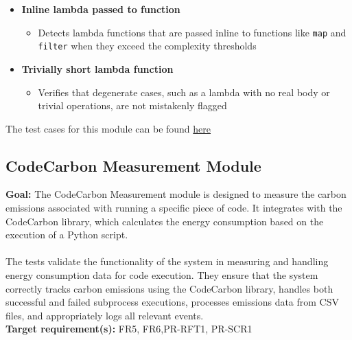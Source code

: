 \documentclass[12pt, titlepage]{article}
\begin{document}
\begin{itemize}
    \item \textbf{Inline lambda passed to function}
        \begin{itemize}
        \item Detects lambda functions that are passed inline to functions like \texttt{map} and \texttt{filter} when they exceed the complexity thresholds
        \end{itemize}

    \item \textbf{Trivially short lambda function}
        \begin{itemize}
        \item Verifies that degenerate cases, such as a lambda with no real body or trivial operations, are not mistakenly flagged
        \end{itemize}
\end{itemize}

  \noindent The test cases for this module can be found
  \href{https://github.com/ssm-lab/capstone--source-code-optimizer/blob/main/tests/analyzers/test_long_lambda_element_analyzer.py}{here}

  \subsection{CodeCarbon Measurement Module}
  \textbf{Goal:} The CodeCarbon Measurement module is designed to
  measure the carbon emissions associated with running a specific
  piece of code. It integrates with the CodeCarbon library, which
  calculates the energy consumption based on the execution of a
  Python script.\\ \\
  \noindent The tests validate the functionality of the system in
  measuring and handling energy consumption data for code execution.
  They ensure that the system correctly tracks carbon emissions using
  the CodeCarbon library, handles both successful and failed
  subprocess executions, processes emissions data from CSV files, and
  appropriately logs all relevant events.\\

  \noindent \textbf{Target requirement(s):} FR5, FR6,PR-RFT1,
  PR-SCR1~\cite{SRS} \\
\end{document}
